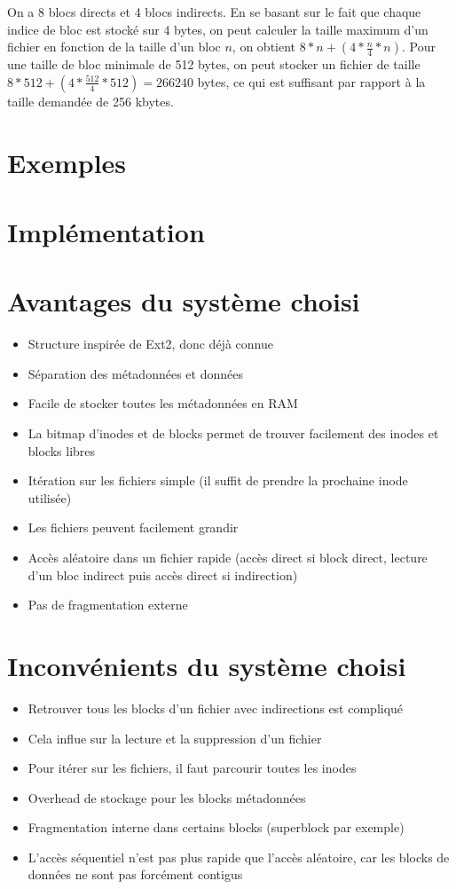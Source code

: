 \documentclass{article}
\begin{document}
On a 8 blocs directs et 4 blocs indirects. En se basant sur le fait que chaque indice de bloc est stocké sur 4 bytes, on peut calculer la taille maximum d'un fichier en fonction de la taille d'un bloc $n$, on obtient $8 * n + (4 * \frac{n}{4} * n)$. Pour une taille de bloc minimale de 512 bytes, on peut stocker un fichier de taille $8 * 512 + (4 * \frac{512}{4} * 512)=266240$ bytes, ce qui est suffisant par rapport à la taille demandée de 256 kbytes.

\section{Exemples}
\section{Implémentation}
\section{Avantages du système choisi}
\begin{itemize}
	\item Structure inspirée de Ext2, donc déjà connue
	\item Séparation des métadonnées et données
	\item Facile de stocker toutes les métadonnées en RAM
	\item La bitmap d'inodes et de blocks permet de trouver facilement des inodes et blocks libres
	\item Itération sur les fichiers simple (il suffit de prendre la prochaine inode utilisée)
	\item Les fichiers peuvent facilement grandir
	\item Accès aléatoire dans un fichier rapide (accès direct si block direct, lecture d'un bloc indirect puis accès direct si indirection)
	\item Pas de fragmentation externe
\end{itemize}
\section{Inconvénients du système choisi}
\begin{itemize}
	\item Retrouver tous les blocks d'un fichier avec indirections est compliqué
	\item Cela influe sur la lecture et la suppression d'un fichier
	\item Pour itérer sur les fichiers, il faut parcourir toutes les inodes
	\item Overhead de stockage pour les blocks métadonnées
	\item Fragmentation interne dans certains blocks (superblock par exemple)
	\item L'accès séquentiel n'est pas plus rapide que l'accès aléatoire, car les blocks de données ne sont pas forcément contigus
\end{itemize}
\end{document}
